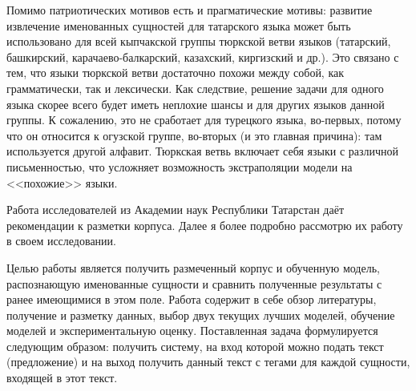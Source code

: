 Помимо патриотических мотивов есть и прагматические мотивы: развитие извлечение именованных сущностей для татарского языка может быть использовано для всей кыпчакской группы тюркской ветви языков (татарский, башкирский, карачаево-балкарский, казахский, киргизский и др.). Это связано с тем, что языки тюркской ветви достаточно похожи между собой, как грамматически, так и лексически. Как следствие, решение задачи для одного языка скорее всего будет иметь неплохие шансы и для других языков данной группы. К сожалению, это не сработает для турецкого языка, во-первых, потому что он относится к огузской группе, во-вторых (и это главная причина): там используется другой алфавит. Тюркская ветвь включает себя языки с различной письменностью, что усложняет возможность экстраполяции модели на <<похожие>> языки. %

Работа \cite{Nevzorova} исследователей из Академии наук Республики Татарстан даёт рекомендации к разметки корпуса. Далее я более подробно рассмотрю их работу в своем исследовании.

Целью работы является получить размеченный корпус и обученную модель, распознающую именованные сущности и сравнить полученные результаты с ранее имеющимися в этом поле. Работа содержит в себе обзор литературы, получение и разметку данных, выбор двух текущих лучших моделей, обучение моделей и экспериментальную оценку. Поставленная задача формулируется следующим образом: получить систему, на вход которой можно подать текст (предложение) и на выход получить данный текст с тегами для каждой сущности, входящей в этот текст.












